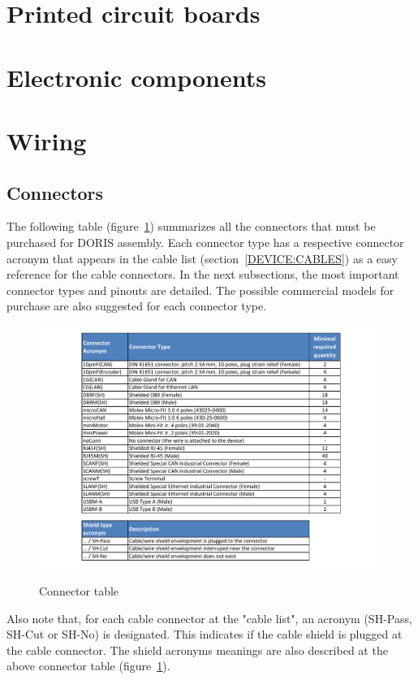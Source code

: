 \section{Printed circuit boards}
\section{Electronic components}

\section{Wiring}
\subsection{Connectors} \label{DEVICE:CONNECTORS}
The following table (figure~\ref{FIG:DEVICECONNECTORTABLE1}) summarizes all the connectors that must be purchased for DORIS assembly. Each connector type has a respective connector acronym that appears in the cable list (section~\ref{DEVICE:CABLES}) as a easy reference for the cable connectors. In the next subsections, the most important connector types and pinouts are detailed. The possible commercial models for purchase are also suggested for each connector type.
\begin{figure}
  \centering
  \includegraphics[angle=90,width=1\columnwidth]{figs/body02/FIGDEVICECONNECTORTABLE1.pdf}\\
  \caption[Connector table]{Connector table}
  \label{FIG:DEVICECONNECTORTABLE1}
\end{figure}
Also note that, for each cable connector at the "cable list", an acronym (SH-Pass, SH-Cut or SH-No) is designated. This indicates if the cable shield is plugged at the cable connector. The shield acronyms meanings are also described at the above connector table (figure~\ref{FIG:DEVICECONNECTORTABLE1}).

